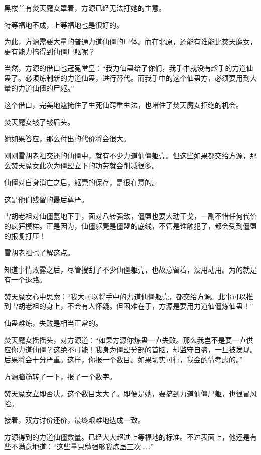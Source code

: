 
\begin{this_body}



黑楼兰有焚天魔女罩着，方源已经无法打她的主意。

特等福地不成，上等福地也是很好的。

为此，方源需要大量的普通力道仙僵的尸体。而在北原，还能有谁能比焚天魔女，更有能力搞得到仙僵尸躯呢？

当然，方源的借口也冠冕堂皇：“我力仙蛊给了你们，我手中就没有趁手的力道仙蛊了。必须炼制新的力道仙蛊，进行替代。而我手中的这个仙蛊方，必须要用到大量的力道仙僵的尸躯。”

这个借口，完美地遮掩住了生死仙窍重生法，也堵住了焚天魔女拒绝的机会。

焚天魔女皱了皱眉头。

她如果答应，那么付出的代价将会很大。

刚刚雪胡老祖交还的仙僵中，就有不少力道仙僵躯壳。但这些如果都交给方源，那么焚天魔女此次为僵盟立下的功劳就会削减很多。

仙僵对自身消亡之后，躯壳的保存，是很在意的。

这是他们残留的最后尊严。

雪胡老祖对仙僵墓地下手，面对八转强敌，僵盟也要大动干戈，一副不惜任何代价的疯狂模样。正是因为，仙僵躯壳是僵盟的底线，不管是谁触犯了，都会受到僵盟的报复打压！

雪胡老祖也了解这点。

知道事情败露之后，尽管搜刮了不少仙僵躯壳，也故意留着，没用动用。为的就是有一个退路。

焚天魔女心中思索：“我大可以将手中的力道仙僵躯壳，都交给方源。此事可以推到雪胡老祖的身上，不会有人怀疑。但困难在于，方源是要用力道仙僵炼仙蛊！”

仙蛊难炼，失败是相当正常的。

焚天魔女摇摇头，对方源道：“如果方源你炼蛊一直失败。那么我岂不是要一直供应你力道仙僵？这绝不可能！我身为僵盟分部的首脑，却监守自盗，一旦被发现。后果将会十分严重。这样，你报一个数目。如果切实可行，我会酌情考虑的。”

方源脑筋转了一下，报了一个数字。

焚天魔女立即否决，这个数目太大了。即便是她，要搞到力道仙僵尸躯，也很冒风险。

接着，双方讨价还价，最终艰难地达成一致。

方源得到的力道仙僵数量。已经大大超过上等福地的标准。不过表面上，他还是有些不满意地道：“这些量只勉强够我炼蛊三次……”


\end{this_body}
